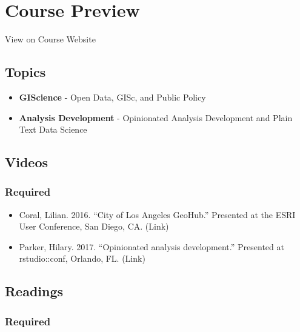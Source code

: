 \documentclass[
]{book}
\providecommand{\tightlist}{%
  \setlength{\itemsep}{0pt}\setlength{\parskip}{0pt}}
\begin{document}
\hypertarget{course-preview}{%
\section*{Course Preview}\label{course-preview}}

View on Course Website

\hypertarget{topics}{%
\subsection*{Topics}\label{topics}}

\begin{itemize}
\tightlist
\item
  \textbf{GIScience} - Open Data, GISc, and Public Policy
\item
  \textbf{Analysis Development} - Opinionated Analysis Development and Plain Text Data Science
\end{itemize}

\hypertarget{videos}{%
\subsection*{Videos}\label{videos}}

\hypertarget{required}{%
\subsubsection*{Required}\label{required}}

\begin{itemize}
\tightlist
\item
  Coral, Lilian. 2016. ``City of Los Angeles GeoHub.'' Presented at the ESRI User Conference, San Diego, CA. (Link)
\item
  Parker, Hilary. 2017. ``Opinionated analysis development.'' Presented at rstudio::conf, Orlando, FL. (Link)
\end{itemize}

\hypertarget{readings-1}{%
\subsection*{Readings}\label{readings-1}}

\hypertarget{required-1}{%
\subsubsection*{Required}\label{required-1}}
\end{document}
